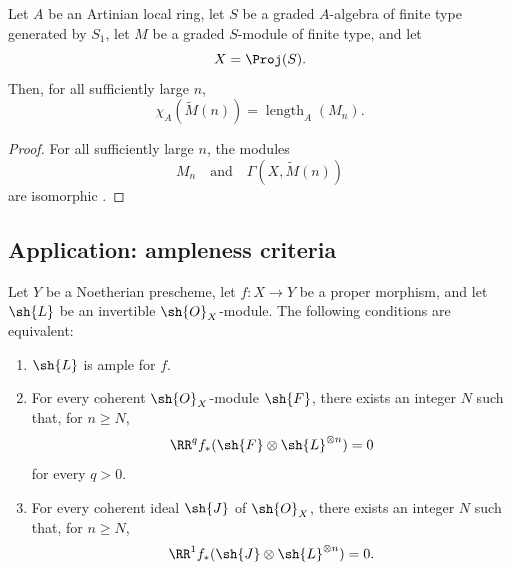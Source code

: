 \begin{corollary}[2.5.4]
\label{III.2.5.4}
Let $A$ be an Artinian local ring, let $S$ be a graded $A$-algebra of finite type generated by $S_1$, let $M$ be a graded $S$-module of finite type, and let
\[
  X=\Proj(S).
\]
Then, for all sufficiently large $n$,
\[
  \chi_A(\widetilde{M}(n))
  =
  \operatorname{length}_A(M_n).
\]
\end{corollary}

\begin{proof}
For all sufficiently large $n$, the modules
\[
  M_n
  \quad\text{and}\quad
  \Gamma(X,\widetilde{M}(n))
\]
are isomorphic .
\end{proof}


\subsection{Application: ampleness criteria}
\label{subsection:III.2.6}

\begin{proposition}[2.6.1]
\label{III.2.6.1}
Let $Y$ be a Noetherian prescheme, let $f:X\to Y$ be a proper morphism,
and let $\sh{L}$ be an invertible $\sh{O}_X$-module.
The following conditions are equivalent:
\begin{enumerate}
  \item[\emph{a)}] $\sh{L}$ is ample for $f$.
  \item[\emph{b)}] For every coherent $\sh{O}_X$-module $\sh{F}$, there
  exists an integer $N$ such that, for $n\geq N$,
  \[
    \RR^qf_*(\sh{F}\otimes\sh{L}^{\otimes n})=0
  \]
  for every $q>0$.
  \item[\emph{c)}] For every coherent ideal $\sh{J}$ of $\sh{O}_X$, there
  exists an integer $N$ such that, for $n\geq N$,
  \[
    \RR^1f_*(\sh{J}\otimes\sh{L}^{\otimes n})=0.
  \]
\end{enumerate}
\end{proposition}

